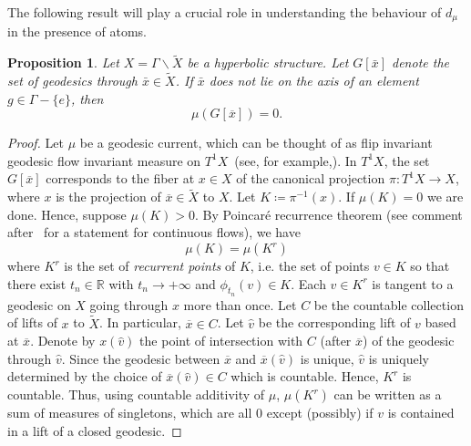 \documentclass[12pt,article]{amsart}
\numberwithin{equation}{section}
\numberwithin{figure}{section}
\newtheorem{proposition}[equation]{Proposition}
\theoremstyle{definition}
\theoremstyle{plain}
\newcommand*{\wt}[1]{\widetilde{#1}}
\begin{document}
The following result will play a crucial role in understanding the behaviour of $d_{\mu}$ in the presence of atoms.

\begin{proposition}
Let $X=\Gamma \backslash \wt{X}$ be a hyperbolic structure. Let $G[\bar{x}]$ denote the set of geodesics through $\bar{x} \in \wt{X}$.
If $\bar{x}$ does not lie on the axis of an element $g \in \Gamma - \{ e\}$, then
\[
\mu(G[\overline{x}])=0.
\]
\label{prop:zeromeasure}
\end{proposition}
\begin{proof}
Let $\mu$ be a geodesic current, which can be thought of as flip invariant geodesic flow invariant measure on $T^1X$~(see, for example,\cite[Chapter~3]{ES22:GeodesicCount}).
In $T^1X$, the set $G[\overline{x}]$ corresponds to the fiber at $x \in X$ of the canonical projection $\pi \colon T^1 X \to X$, where $x$ is the projection of $\overline{x} \in \wt{X}$ to $X$. Let $K \coloneqq \pi^{-1}(x)$.
If $\mu(K)=0$ we are done. Hence, suppose $\mu(K)>0$. By Poincar\'e recurrence theorem (see comment after~\cite[Theorem~1.2.1]{VO16:FoundationsErgodic} for a statement for continuous flows), we have
\[
\mu(K)=\mu(K^r)
\]
where $K^r$ is the set of \emph{recurrent points} of  $K$, i.e. the set of points $v \in K$ so that there exist $t_n \in \mathbb{R}$ with $t_n \to +\infty$ and $\phi_{t_n}(v) \in K$.
Each $v \in K^r$ is tangent to a geodesic on $X$ going through $x$ more than once. Let $C$ be the countable collection of lifts of $x$ to $\wt{X}$. In particular, $\overline{x} \in C$. Let $\hat{v}$ be the corresponding
lift of $v$ based at $\overline{x}$.  Denote by $x(\hat{v})$ the  point of intersection with $C$ (after $\overline{x}$) of the geodesic through $\hat{v}$.
Since the geodesic between $\overline{x}$ and $\overline{x}(\hat{v})$ is unique, $\hat{v}$ is uniquely determined by the choice of $\overline{x}(\hat{v}) \in C$ which is countable. Hence, $K^r$ is countable.
Thus, using countable additivity of $\mu$, $\mu(K^r)$ can be written as a sum of measures of singletons, which are all 0 except (possibly) if $v$ is contained in a lift of a closed geodesic. 
\end{proof}
\end{document}
